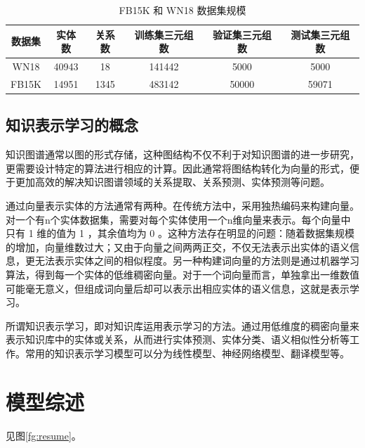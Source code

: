 \documentclass{llncs}
\begin{document}
\begin{table}
	\centering
	\caption{ FB15K 和 WN18 数据集规模}
	\label{tb:FB15K&WN18}
	\begin{threeparttable}
		\begin{tabular}{cccccc}
			\hline
			\textbf{数据集} & \textbf{实体数} & \textbf{关系数} & \textbf{训练集三元组数} & \textbf{验证集三元组数} & \textbf{测试集三元组数} \\ \hline
			WN18 & 40943 & 18 & 141442 & 5000 & 5000 \\
			FB15K & 14951 & 1345 & 483142 & 50000 & 59071 \\ \hline
		\end{tabular}
	\end{threeparttable}
\end{table}

\subsection{知识表示学习的概念}

知识图谱通常以图的形式存储，这种图结构不仅不利于对知识图谱的进一步研究，更需要设计特定的算法进行相应的计算。因此通常将图结构转化为向量的形式，便于更加高效的解决知识图谱领域的关系提取、关系预测、实体预测等问题。

通过向量表示实体的方法通常有两种。在传统方法中，采用独热编码来构建向量。对一个有n个实体数据集，需要对每个实体使用一个n维向量来表示。每个向量中只有 1 维的值为 1 ，其余值均为 0 。这种方法存在明显的问题：随着数据集规模的增加，向量维数过大；又由于向量之间两两正交，不仅无法表示出实体的语义信息，更无法表示实体之间的相似程度。另一种构建词向量的方法则是通过机器学习算法，得到每一个实体的低维稠密向量。对于一个词向量而言，单独拿出一维数值可能毫无意义，但组成词向量后却可以表示出相应实体的语义信息，这就是表示学习。

所谓知识表示学习\cite{DBLP:journals/corr/abs-1812-10901}，即对知识库运用表示学习的方法。通过用低维度的稠密向量来表示知识库中的实体或关系，从而进行实体预测\cite{DBLP:journals/tkde/WangMWG17}、实体分类、语义相似性分析等工作。常用的知识表示学习模型可以分为线性模型、神经网络模型、翻译模型等。

\section{模型综述}

见图\ref{fg:resume}。
\end{document}
